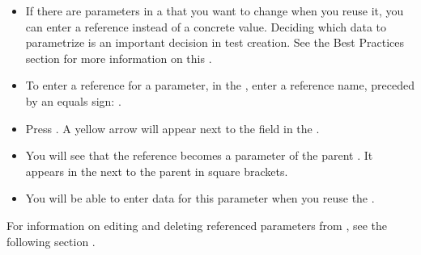 \begin{itemize}
\item If there are parameters in a \gdcase{} that you want to change when you reuse it, you can enter a reference instead of a concrete value. Deciding which data to parametrize is an important decision in test creation. See the Best Practices section for more information on this .
\item To enter a reference for a parameter, in the \gdpropview{}, enter a reference name, preceded by an equals sign: . 

\item Press . 
A yellow arrow will appear next to the  field in the \gdpropview{}.
\item You will see that the reference becomes a parameter of the parent \gdcase{}. It appears in the \gdtestcasebrowser{} next to the parent \gdcase{} in square brackets. 
\item You will be able to enter data for this parameter when you reuse the \gdcase{}. 
\end{itemize}

For information on editing and deleting referenced parameters from \gdcases{}, see the following section . 



